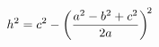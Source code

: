 \documentclass[preview]{standalone}
\begin{document}
\begin{align*}
\special{dvisvgm:raw <g id='unique000'>}h^2 = c^2 - \left(\frac{a^2 - b^2 + c^2}{2a}\right)^{\!2}\special{dvisvgm:raw </g>}
\end{align*}
\end{document}

